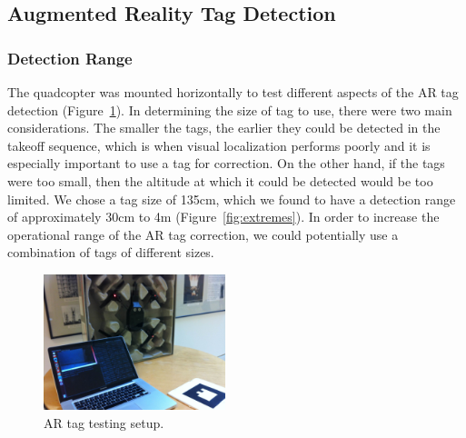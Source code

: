	\subsection{Augmented Reality Tag Detection}

		\subsubsection{Detection Range}

			The quadcopter was mounted horizontally to test different aspects of the AR tag detection (Figure~\ref{fig:rig}). In determining the size of tag to use, there were two main considerations. The smaller the tags, the earlier they could be detected in the takeoff sequence, which is when visual localization performs poorly and it is especially important to use a tag for correction. On the other hand, if the tags were too small, then the altitude at which it could be detected would be too limited. We chose a tag size of 135cm, which we found to have a detection range of approximately 30cm to 4m (Figure~\ref{fig:extremes}). In order to increase the operational range of the AR tag correction, we could potentially use a combination of tags of different sizes.

			\begin{figure}[ht]
			        \centering
					\includegraphics[width=200px]{../images/rig.jpg}
					\caption{AR tag testing setup.}\label{fig:rig}
			\end{figure}

